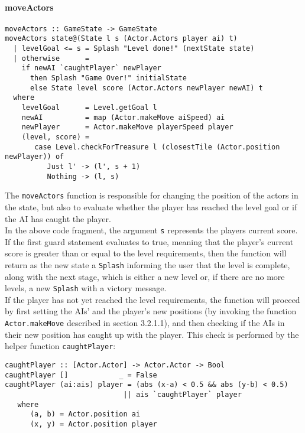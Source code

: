 \documentclass{article}
\begin{document}
\paragraph{moveActors}
\begin{verbatim}
moveActors :: GameState -> GameState
moveActors state@(State l s (Actor.Actors player ai) t)
  | levelGoal <= s = Splash "Level done!" (nextState state)
  | otherwise      =
    if newAI `caughtPlayer` newPlayer
      then Splash "Game Over!" initialState
      else State level score (Actor.Actors newPlayer newAI) t
  where
    levelGoal      = Level.getGoal l
    newAI          = map (Actor.makeMove aiSpeed) ai
    newPlayer      = Actor.makeMove playerSpeed player
    (level, score) =
       case Level.checkForTreasure l (closestTile (Actor.position newPlayer)) of
          Just l' -> (l', s + 1)
          Nothing -> (l, s)
\end{verbatim}
		The \texttt{moveActors} function is responsible for changing the position of the actors in the state, but also to evaluate whether the player has reached the level goal or if the AI has caught the player. \\
		\newline
        In the above code fragment, the argument \texttt{s} represents the players current score. If the first guard statement evaluates to true, meaning that the player's current score is greater than or equal to the level requirements, then the function will return as the new state a \texttt{Splash} informing the user that the level is complete, along with the next stage, which is either a new level or, if there are no more levels, a new \texttt{Splash} with a victory message. \\
        \newline
        If the player has not yet reached the level requirements, the function will proceed by first setting the AIs' and the player's new positions (by invoking the function \texttt{Actor.makeMove} described in section 3.2.1.1), and then checking if the AIs in their new position has caught up with the player. This check is performed by the helper function \texttt{caughtPlayer}: \\

\begin{verbatim}
caughtPlayer :: [Actor.Actor] -> Actor.Actor -> Bool
caughtPlayer []            _ = False
caughtPlayer (ai:ais) player = (abs (x-a) < 0.5 && abs (y-b) < 0.5)
                            || ais `caughtPlayer` player
   where
      (a, b) = Actor.position ai
      (x, y) = Actor.position player
\end{verbatim}
\end{document}
